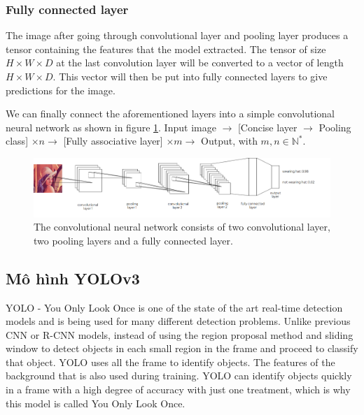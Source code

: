 \documentclass[conference]{IEEEtran}
\begin{document}
\subsubsection{Fully connected layer}
The image after going through convolutional layer and pooling layer produces a tensor containing the features that the model extracted. The tensor of size $ H \times W \times D $ at the last convolution layer will be converted to a vector of length $ H \times W \times D $. This vector will then be put into fully connected layers to give predictions for the image.

We can finally connect the aforementioned layers into a simple convolutional neural network as shown in figure \ref{fig:cnn_simplified}.
Input image $ \rightarrow $ [Concise layer $ \rightarrow $ Pooling class] $ \times n \rightarrow $ [Fully associative layer] $ \times m \rightarrow $ Output, with $ m, n \in { \mathbb {N}} ^ * $.
\begin{figure}[ht]
	\centerline{\includegraphics[scale=0.18]{images/cnn_simplified.png}}
  	\caption{The convolutional neural network consists of two convolutional layer, two pooling layers and a fully connected layer.}
  	\label{fig:cnn_simplified}
\end{figure}
\subsection{Mô hình YOLOv3}
YOLO - You Only Look Once \cite{redmod:2016:yolo} is one of the state of the art real-time detection models and is being used for many different detection problems. Unlike previous CNN or R-CNN models, instead of using the region proposal method and sliding window to detect objects in each small region in the frame and proceed to classify that object. YOLO uses all the frame to identify objects. The features of the background that is also used during training. YOLO can identify objects quickly in a frame with a high degree of accuracy with just one treatment, which is why this model is called You Only Look Once.
\end{document}
